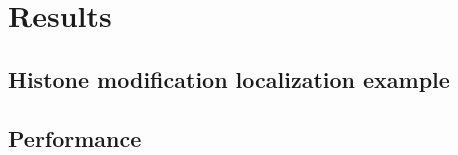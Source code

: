 \documentclass{bioinfo}
\begin{document}
\begin{methods}


\end{methods}





\section{Results}

\subsection{Histone modification localization example}

\subsection{Performance}


%
%
\end{document}
